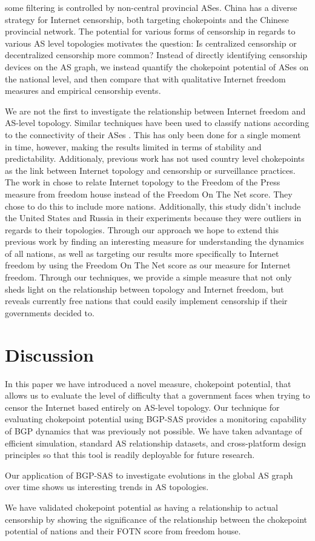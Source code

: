 \documentclass[10pt, conference, letterpaper]{IEEEtran}
\newcommand{\toolname}{BGP-SAS }
\begin{document}
some filtering is controlled by non-central provincial ASes. China has a
diverse strategy for Internet censorship, both targeting chokepoints and the
Chinese provincial network. The potential for various forms of censorship in
regards to various AS level topologies motivates the question: Is centralized
censorship or decentralized censorship more common? Instead of directly
identifying censorship devices on the AS graph, we instead quantify the
chokepoint potential of ASes on the national level, and then compare that with
qualitative Internet freedom measures and empirical censorship events.
\par
We are not the first to investigate the relationship between Internet freedom and
AS-level topology. Similar techniques have been used to classify nations according
to the connectivity of their ASes \cite{politicsrouting}. This has only been done for a
single moment in time, however, making the results limited in terms of stability and predictability.
Additionaly, previous work has not used country level chokepoints as the link between Internet topology
and censorship or surveillance practices. The work in \cite{politicsrouting} chose to relate Internet topology
to the Freedom of the Press measure from freedom house instead of the Freedom On The Net score. They chose to do this
to include more nations. Additionally, this study didn't include the United States and Russia in their experiments because they were
outliers in regards to their topologies. Through our approach we hope to extend this previous work by finding an interesting measure for
understanding the dynamics of all nations, as well as targeting our results more specifically to Internet freedom by using the Freedom On
The Net score as our measure for Internet freedom. Through our techniques, we provide a simple measure that not only 
sheds light on the relationship between topology and Internet freedom, but reveals currently free
nations that could easily implement censorship if their governments decided to.


\section{Discussion}

In this paper we have introduced a novel measure, chokepoint potential, that allows us to
evaluate the level of difficulty that a government faces when trying to censor the Internet
based entirely on AS-level topology. Our technique for evaluating chokepoint potential using
\toolname provides a monitoring capability of BGP dynamics that was previously not possible.
We have taken advantage of efficient simulation, standard AS relationship datasets, and cross-platform
design principles so that this tool is readily deployable for future research.
\par
Our application of \toolname to investigate evolutions in the global AS graph over time shows us
interesting trends in AS topologies.
\par
We have validated chokepoint potential as having a relationship to actual censorship by showing
the significance of the relationship between the chokepoint potential of nations and their FOTN
score from freedom house.
\end{document}

